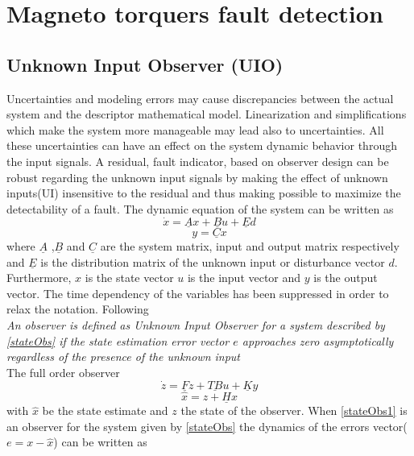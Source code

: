 
\section{Magneto torquers  fault detection}
\subsection{Unknown Input Observer (UIO)}
Uncertainties and modeling errors may cause discrepancies between the actual system and the descriptor mathematical model. Linearization and simplifications which make the system more manageable may lead also to uncertainties. All these uncertainties can have an effect on the system dynamic behavior through the input signals.   
A residual, fault indicator, based on observer design can be robust regarding the unknown input signals by making the effect of unknown inputs(UI) insensitive to the residual and thus making possible to maximize the detectability of a fault. The dynamic equation of the system can be written as
%
\begin{equation}
\dot{x} = \underline Ax+\underline B u+\underline Ed
\label{stateObs}
\end{equation}
\begin{equation}
y = \underline C x
\end{equation}
%
where $\underline A$ ,$\underline B$ and $ \underline C $ are the system matrix, input and output matrix respectively and $\underline E$ is the distribution matrix of the unknown input or disturbance vector $d$. Furthermore, $x$ is the state vector $u$ is the input vector and $y$ is the output vector. The time dependency of the variables has been suppressed in order to relax the notation. Following \cite{UIO} 
%
%
\\
\textit{An observer is defined as Unknown Input Observer for a system described by \eqref{stateObs} if the state estimation error vector $e$ approaches zero asymptotically regardless of the presence of the unknown input }
\\
The full order observer
\begin{equation}
\dot{z} = \underline Fz+\underline{TB} u+\underline Ky
\label{stateObs1}
\end{equation}
\begin{equation}
\hat{x} = z + \underline H x
\end{equation}
with $\hat{x}$ be the state estimate and $z$ the state of the observer. When \eqref{stateObs1} is an observer for the system given by \eqref{stateObs} the dynamics of the errors vector($e = x - \hat{x}$) can be written as\cite{UIO} 
